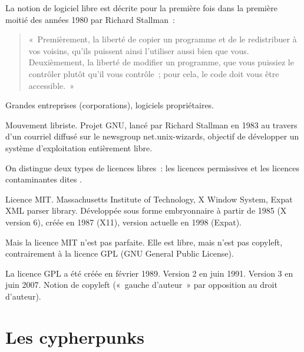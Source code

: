 
La notion de logiciel libre est décrite pour la première fois dans la première moitié des années 1980 par Richard Stallman~:

\begin{quote}
«~Premièrement, la liberté de copier un programme et de le redistribuer à vos voisins, qu'ils puissent ainsi l'utiliser aussi bien que vous. Deuxièmement, la liberté de modifier un programme, que vous puissiez le contrôler plutôt qu'il vous contrôle~; pour cela, le code doit vous être accessible.~»
\end{quote}

Grandes entreprises (corporations), logiciels propriétaires.

Mouvement libriste. Projet GNU, lancé par Richard Stallman en 1983 au travers d'un courriel diffusé sur le newsgroup net.unix-wizards, objectif de développer un système d'exploitation entièrement libre.

On distingue deux types de licences libres~: les licences permissives et les licences contaminantes dites .

Licence MIT. Massachusetts Institute of Technology, X Window System, Expat XML parser library. Développée sous forme embryonnaire à partir de 1985 (X version 6), créée en 1987 (X11), version actuelle en 1998 (Expat).

Mais la licence MIT n'est pas parfaite. Elle est libre, mais n'est pas copyleft, contrairement à la licence GPL (GNU General Public License).

La licence GPL a été créée en février 1989. Version 2 en juin 1991. Version 3 en juin 2007. Notion de copyleft («~gauche d'auteur~» par opposition au droit d'auteur).



\section{Les cypherpunks}

